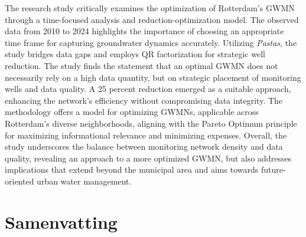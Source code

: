 The research study critically examines the optimization of Rotterdam’s GWMN through a time-focused analysis and reduction-optimization model. The observed data from 2010 to 2024 highlights the importance of choosing an appropriate time frame for capturing groundwater dynamics accurately. Utilizing \textit{Pastas}, the study bridges data gaps and employs QR factorization for strategic well reduction. The study finds the statement that an optimal GWMN does not necessarily rely on a high data quantity, but on strategic placement of monitoring wells and data quality. A 25 percent reduction emerged as a suitable approach, enhancing the network’s efficiency without compromising data integrity. The methodology offers a model for optimizing GWMNs, applicable across Rotterdam’s diverse neighborhoods, aligning with the Pareto Optimum principle for maximizing informational relevance and minimizing expenses. Overall, the study underscores the balance between monitoring network density and data quality, revealing an approach to a more optimized GWMN, but also addresses implications that extend beyond the municipal area and aims towards future-oriented urban water management.

\chapter*{Samenvatting}

